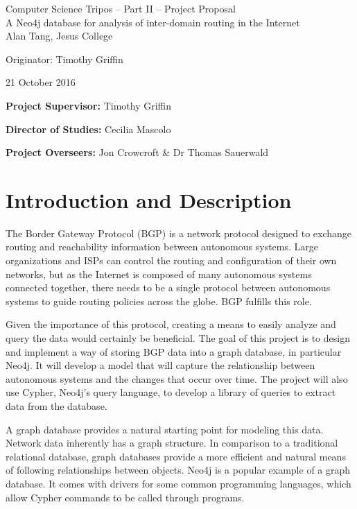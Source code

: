\begin{center}
\Large
Computer Science Tripos -- Part II -- Project Proposal\\[4mm]
\LARGE
A Neo4j database for analysis of inter-domain routing in the Internet\\[4mm]

\large
Alan Tang, Jesus College

Originator: Timothy Griffin

21 October 2016
\end{center}

\vspace{5mm}

\textbf{Project Supervisor:} Timothy Griffin

\textbf{Director of Studies:} Cecilia Mascolo

\textbf{Project Overseers:} Jon Crowcroft  \& Dr Thomas Sauerwald



\section*{Introduction and Description}

The Border Gateway Protocol (BGP) is a network protocol designed to exchange routing and reachability information between autonomous systems. Large organizations and ISPs can control the routing and configuration of their own networks, but as the Internet is composed of many autonomous systems connected together, there needs to be a single protocol between autonomous systems to guide routing policies across the globe. BGP fulfills this role.

Given the importance of this protocol, creating a means to easily analyze and query the data would certainly be beneficial. The goal of this project is to design and implement a way of storing BGP data into a graph database, in particular Neo4j. It will develop a model that will capture the relationship between autonomous systems and the changes that occur over time. The project will also use Cypher, Neo4j's query language, to develop a library of queries to extract data from the database.

A graph database provides a natural starting point for modeling this data. Network data inherently has a graph structure. In comparison to a traditional relational database, graph databases provide a more efficient and natural means of following relationships between objects. Neo4j is a popular example of a graph database. It comes with drivers for some common programming languages, which allow Cypher commands to be called through programs.


